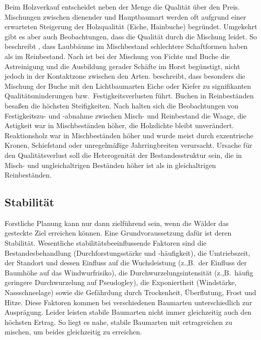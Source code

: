 \documentclass[twocolumn, paper=a4, fontsize=10pt, bibliography=totoc, index=totoc]{scrartcl}
\begin{document}
Beim Holzverkauf entscheidet neben der Menge die Qualität über den
Preis. Mischungen zwischen dienender und Hauptbaumart werden oft
aufgrund einer erwarteten Steigerung der Holzqualität (Eiche,
Hainbuche) begründet. Umgekehrt gibt es aber auch Beobachtungen, dass
die Qualität durch die Mischung leidet. So beschreibt
\citet{burger1925plenterwald}, dass Laubbäume im Mischbestand
schlechtere Schaftformen haben als im Reinbestand. Nach
\citet{tiebel2016qualitaet} ist bei der Mischung von Fichte und Buche
die Astreinigung und die Ausbildung gerader Schäfte im Horst
begünstigt, nicht jedoch in der Kontaktzone zwischen den
Arten. \citet{rais2019MischungQualitaet} beschreibt, dass besonders die
Mischung der Buche mit den Lichtbaumarten Eiche oder Kiefer zu
signifikanten Qualitätsminderungen bzw.\ Festigkeitsverlusten
führt. Buchen in Reinbeständen besaßen die höchsten
Steifigkeiten. Nach \citet{pretzsch2016holzqualitaetMischRein} halten
sich die Beobachtungen von Festigkeitszu- und -abnahme zwischen
Misch- und Reinbestand die Waage, die Astigkeit war in Mischbeständen
höher, die Holzdichte bleibt unverändert. Reaktionsholz war in
Mischbeständen höher und wurde meist durch exzentrische Kronen,
Schiefstand oder unregelmäßige Jahrringbreiten verursacht. Ursache für
den Qualitätsverlust soll die Heterogenität der Bestandesstruktur
sein, die in Misch- und ungleichaltrigen Beständen höher ist als in
gleichaltrigen Reinbeständen.

\subsection{Stabilität}
\label{ssec:stabilitaet}

Forstliche Planung kann nur dann zielführend sein, wenn die Wälder das gesteckte
Ziel erreichen können. Eine Grundvoraussetzung dafür ist deren Stabilität.
Wesentliche stabilitätsbeeinflussende Faktoren sind die
Bestandesbehandlung (Durchforstungsstärke und -häufigkeit), die
Umtriebszeit, der Standort und dessen Einfluss auf die Wuchsleistung
(z.,B.\ der Einfluss der Baumhöhe auf das Windwurfrisiko), die
Durchwurzelungsintensität (z.,B.\ häufig geringere Durchwurzelung auf
Pseudogley), die Exponiertheit (Windstärke, Nassschneelage) sowie die
Gefährdung durch Trockenheit, Überflutung, Frost und Hitze.
Diese Faktoren kommen bei verschiedenen
Baumarten unterschiedlich zur Ausprägung. Leider leisten stabile Baumarten nicht
immer gleichzeitig auch den höchsten Ertrag. So liegt es nahe, stabile Baumarten
mit ertragreichen zu mischen, um beides gleichzeitig zu erreichen.
\end{document}
